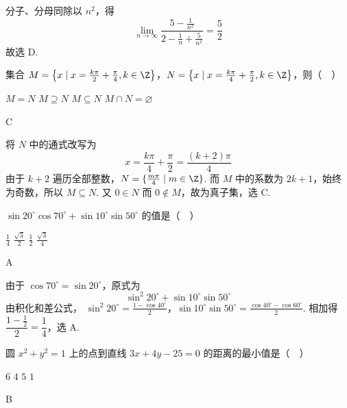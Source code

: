 \documentclass[UTF8,a4paper,oneside,11pt]{ctexbook}
\begin{document}
\begin{solution}
分子、分母同除以 \(n^2\)，得
\[
\lim_{n\to\infty}\frac{5-\frac{1}{n^2}}{2-\frac{1}{n}+\frac{5}{n^2}}=\frac{5}{2}
\]
故选 D.
\end{solution}

\begin{problem}
集合 \(M=\left\{x \mid x=\frac{k\pi}{2}+\frac{\pi}{4}, k\in\Z\right\}\)，\(N=\left\{x \mid x=\frac{k\pi}{4}+\frac{\pi}{2}, k\in\Z\right\}\)，则（\(\quad\)）

\choices
    {\(M=N\)}
    {\(M\supseteq N\)}
    {\(M\subseteq N\)}
    {\(M\cap N=\varnothing\)}
\end{problem}

\begin{answer}
C
\end{answer}

\begin{solution}
将 \(N\) 中的通式改写为
\[
x=\frac{k\pi}{4}+\frac{\pi}{2}=\frac{(k+2)\pi}{4}
\]
由于 \(k+2\) 遍历全部整数，\(N=\{\frac{m\pi}{4}\mid m\in\Z\}\). 而 \(M\) 中的系数为 \(2k+1\)，始终为奇数，所以 \(M\subseteq N\). 又 \(0\in N\) 而 \(0\notin M\)，故为真子集，选 C.
\end{solution}

\begin{problem}
\(\sin 20^{\circ}\cos 70^{\circ}+\sin 10^{\circ}\sin 50^{\circ}\) 的值是（\(\quad\)）

\choices
    {\(\frac{1}{4}\)}
    {\(\frac{\sqrt{3}}{2}\)}
    {\(\frac{1}{2}\)}
    {\(\frac{\sqrt{3}}{4}\)}
\end{problem}

\begin{answer}
A
\end{answer}

\begin{solution}
由于 \(\cos70^\circ=\sin20^\circ\)，原式为
\[
\sin^2 20^\circ+\sin10^\circ\sin50^\circ
\]
由积化和差公式，
\(\sin^2 20^\circ=\frac{1-\cos40^\circ}{2}\)，\(\sin10^\circ\sin50^\circ=\frac{\cos40^\circ-\cos60^\circ}{2}\).
相加得 \(\dfrac{1-\frac12}{2}=\dfrac14\)，选 A.
\end{solution}

\begin{problem}
圆 \(x^2+y^2=1\) 上的点到直线 \(3x+4y-25=0\) 的距离的最小值是（\(\quad\)）

\choices
    {\(6\)}
    {\(4\)}
    {\(5\)}
    {\(1\)}
\end{problem}

\begin{answer}
B
\end{answer}
\end{document}
